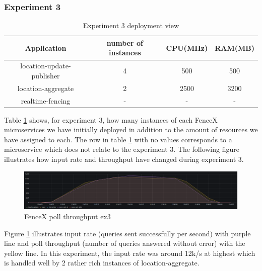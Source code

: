 \documentclass[a4]{report}
\begin{document}
    \subsubsection{Experiment 3}
    \begin{table}[h!]
        \centering
        \begin{tabular}{|c|c|c|c|}
            \hline
            Application               & number of instances & CPU(MHz) & RAM(MB) \\
            \hline
            location-update-publisher & 4                   & 500      & 500     \\
            location-aggregate        & 2                   & 2500     & 3200    \\
            realtime-fencing          & -                   & -        & -       \\
            \hline
        \end{tabular}
        \caption{Experiment 3 deployment view}
        \label{table:ex3-dv}
    \end{table}

    Table \ref{table:ex3-dv} shows, for experiment 3, how many instances of each FenceX microservices we have initially
    deployed in addition to the amount of resources we have assigned to each.
    The row in table \ref{table:ex3-dv} with no values corresponds to a microservice which does not relate to the
    experiment 3.
    The following figure illustrates how input rate and throughput have changed during experiment 3.

    \begin{figure}[h!]
        \centering
        \caption{FenceX poll throughput ex3}
        \label{fig:ex3}
        \includegraphics[width=\linewidth, scale=2]{images/evaluation/ex3-benchmarking(16,9).png}
    \end{figure}

    Figure \ref{fig:ex3} illustrates input rate (queries sent successfully per second) with purple line and poll
    throughput (number of queries answered without error) with the yellow line.
    In this experiment, the input rate was around 12k/s at highest which is handled well by 2 rather rich instances of
    location-aggregate.
\end{document}
